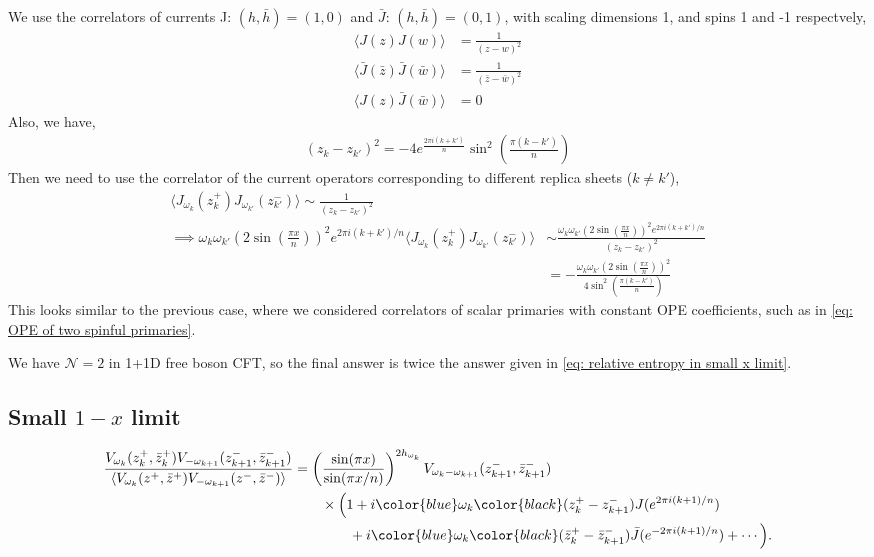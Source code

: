 \documentclass[11pt]{article}
\newcommand{\lb}{\left(}
\newcommand{\rb}{\right)}
\begin{document}
We use the correlators of currents J: $(h,\bar{h}) = (1,0)$ and $\bar{J}$: $(h,\bar{h}) = (0,1)$, with scaling dimensions 1, and spins 1 and -1 respectvely,
\begin{align}
    \langle J(z) J(w) \rangle &= \frac{1}{(z-w)^2} \nonumber \\
    \langle \bar{J}(\bar{z}) \bar{J}(\bar{w}) \rangle&= \frac{1}{(\bar{z} - \bar{w})^2} \nonumber \\
    \langle J(z) \bar{J}(\bar{w}) \rangle &= 0
\end{align}
Also, we have,
\begin{align}
    (z_k - z_{k'})^2 =  -4 e^{\frac{2 \pi i (k+k')}{n}} \sin^2 \lb \frac{\pi (k-k')}{n} \rb
\end{align}
Then we need to use the correlator of the current operators corresponding to different replica sheets ($k \neq k'$),
\begin{align}
    \langle J_{\omega_k}(z_k^+)J_{\omega_{k'}}(z_{k'}^-) \rangle \sim \frac{1} {(z_k - z_{k'})^2}  \nonumber \\
    \implies  \omega_k \omega_{k'} \lb 2 \sin \lb \frac{\pi x}{n}\rb \rb^2 e^{2 \pi i (k+k')/n} \langle J_{\omega_k}(z_k^+)J_{\omega_{k'}}(z_{k'}^-) \rangle &\sim   \frac{\omega_k \omega_{k'}\lb 2 \sin \lb \frac{\pi x}{n}\rb \rb^2 e^{2 \pi i (k+k')/n}}{(z_k - z_{k'})^2} \nonumber \\ 
    & = - \frac{\omega_k \omega_{k'}\lb 2 \sin \lb \frac{\pi x}{n}\rb \rb^2 } {4 \sin ^2 \lb \frac{\pi (k-k')}{n} \rb }
\end{align}
This looks similar to the previous case, where we considered correlators of scalar primaries with constant OPE coefficients, such as in \ref{eq: OPE of two spinful primaries}.

We have $\mathcal{N} = 2$ in 1+1D free boson CFT, so the final answer is twice the answer given in \ref{eq: relative entropy in small x limit}. 

\subsection*{Small $1-x$ limit}

\begin{align}
\frac{
V_{\omega_k}(z_k^+ , \bar{z}_k^+ )
V_{-\omega_{k+1}}(z_{k+1}^- , \bar{z}_{k+1}^-)
}{
\langle
V_{\omega_k}(z^+ , \bar{z}^+ )
V_{-\omega_{k+1}}(z^- , \bar{z}^-)
\rangle
}
&=
\left(
\frac{\sin(\pi x)}{\sin(\pi x/n)}
\right)^{2h_{\omega_k}}
V_{\omega_k-\omega_{k+1}}
(z_{k+1}^- , \bar{z}_{k+1}^-)
\nonumber\\
&\qquad \times
\Bigl(
1
+i\color{blue}\omega_k\color{black}
(z_k^+ - z_{k+1}^-)
J(e^{2\pi i (k+1)/n})
\nonumber\\
&\qquad\qquad
+i\color{blue}\omega_k\color{black}
(\bar z_k^+ - \bar z_{k+1}^-)
\bar J(e^{-2\pi i (k+1)/n})
+\cdots
\Bigr).
\end{align}
\end{document}
